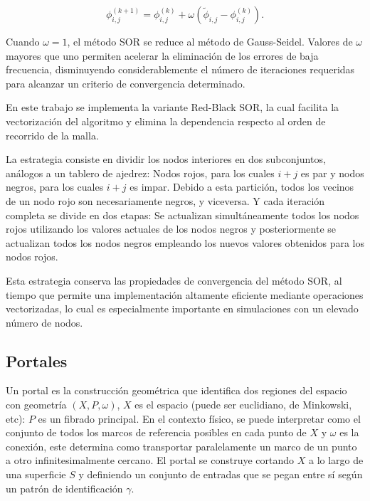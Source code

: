 \documentclass[12pt, twocolumn]{article}
\begin{document}
\begin{equation}
\phi_{i,j}^{(k+1)}
=
\phi_{i,j}^{(k)}
+
\omega
\left(
\tilde{\phi}_{i,j}
-
\phi_{i,j}^{(k)}
\right).
\end{equation}

Cuando $\omega=1$, el método SOR se reduce al método de Gauss-Seidel. Valores de $\omega$ mayores que uno permiten acelerar la eliminación de los errores de baja frecuencia, disminuyendo considerablemente el número de iteraciones requeridas para alcanzar un criterio de convergencia determinado. 

En este trabajo se implementa la variante Red-Black SOR, la cual facilita la vectorización del algoritmo y elimina la dependencia respecto al orden de recorrido de la malla.

La estrategia consiste en dividir los nodos interiores en dos subconjuntos, análogos a un tablero de ajedrez: Nodos rojos, para los cuales $i+j$ es par y nodos negros, para los cuales $i+j$ es impar. Debido a esta partición, todos los vecinos de un nodo rojo son necesariamente negros, y viceversa. Y cada iteración completa se divide en dos etapas: Se actualizan simultáneamente todos los nodos rojos utilizando los valores actuales de los nodos negros y posteriormente se actualizan todos los nodos negros empleando los nuevos valores obtenidos para los nodos rojos.

Esta estrategia conserva las propiedades de convergencia del método SOR, al tiempo que permite una implementación altamente eficiente mediante operaciones vectorizadas, lo cual es especialmente importante en simulaciones con un elevado número de nodos.

\subsection{Portales}\label{sec:portales}

Un portal es la construcción geométrica que identifica dos regiones del espacio con geometría $(X,P,\omega)$, $X$ es el espacio (puede ser euclidiano, de Minkowski, etc): $P$ es un fibrado principal. En el contexto físico, se puede interpretar como el conjunto de todos los marcos de referencia posibles en cada punto de $X$ y $\omega$ es la conexión, este determina como transportar paralelamente un marco de un punto a otro infinitesimalmente cercano. El portal se construye cortando $X$ a lo largo de una superficie $S$ y definiendo un conjunto de entradas que se pegan entre sí según un patrón de identificación $\gamma$.
\end{document}
